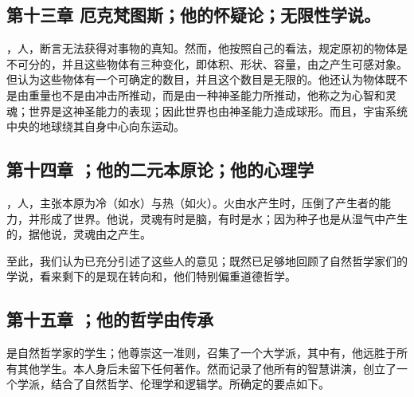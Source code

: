 
\subsection{第十三章 厄克梵图斯；他的怀疑论；无限性学说。}

，人，断言无法获得对事物的真知。然而，他按照自己的看法，规定原初的物体是不可分的，并且这些物体有三种变化，即体积、形状、容量，由之产生可感对象。但认为这些物体有一个可确定的数目，并且这个数目是无限的。他还认为物体既不是由重量也不是由冲击所推动，而是由一种神圣能力所推动，他称之为心智和灵魂；世界是这神圣能力的表现；因此世界也由神圣能力造成球形。而且，宇宙系统中央的地球绕其自身中心向东运动。\par


\subsection{第十四章 ；他的二元本原论；他的心理学}

，人，主张本原为冷（如水）与热（如火）。火由水产生时，压倒了产生者的能力，并形成了世界。他说，灵魂有时是脑，有时是水；因为种子也是从湿气中产生的，据他说，灵魂由之产生。\par

至此，我们认为已充分引述了这些人的意见；既然已足够地回顾了自然哲学家们的学说，看来剩下的是现在转向和，他们特别偏重道德哲学。\par


\subsection{第十五章 ；他的哲学由传承}

是自然哲学家的学生；他尊崇这一准则，召集了一个大学派，其中有，他远胜于所有其他学生。本人身后未留下任何著作。然而记录了他所有的智慧讲演，创立了一个学派，结合了自然哲学、伦理学和逻辑学。所确定的要点如下。\par

